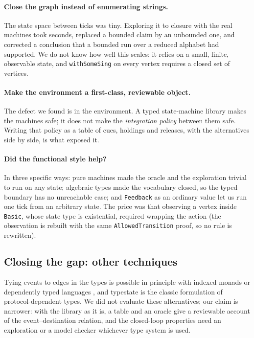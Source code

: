 \documentclass[review]{jfp-epi}
\newcommand{\code}[1]{\texttt{#1}}
\begin{document}
\paragraph{Close the graph instead of enumerating strings.} The state space between ticks was tiny. Exploring it to closure with the real machines took seconds, replaced a bounded claim by an unbounded one, and corrected a conclusion that a bounded run over a reduced alphabet had supported. We do not know how well this scales: it relies on a small, finite, observable state, and \code{withSomeSing} on every vertex requires a closed set of vertices.

\paragraph{Make the environment a first-class, reviewable object.} The defect we found is in the environment. A typed state-machine library makes the machines safe; it does not make the \emph{integration policy} between them safe. Writing that policy as a table of cues, holdings and releases, with the alternatives side by side, is what exposed it.

\paragraph{Did the functional style help?} In three specific ways: pure machines made the oracle and the exploration trivial to run on any state; algebraic types made the vocabulary closed, so the typed boundary has no unreachable case; and \code{Feedback} as an ordinary value let us run one tick from an arbitrary state. The price was that observing a vertex inside \code{Basic}, whose state type is existential, required wrapping the action (the observation is rebuilt with the same \code{AllowedTransition} proof, so no rule is rewritten).

\subsection{Closing the gap: other techniques}

Tying events to edges in the types is possible in principle with indexed monads \cite{atkey2009parameterised} or dependently typed languages \cite{brady2013idris}, and typestate \cite{strom1986typestate} is the classic formulation of protocol-dependent types. We did not evaluate these alternatives; our claim is narrower: with the library as it is, a table and an oracle give a reviewable account of the event--destination relation, and the closed-loop properties need an exploration or a model checker whichever type system is used.
\end{document}
